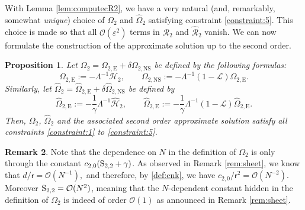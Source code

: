 \documentclass[11pt,reqno,a4paper]{amsart}
\def\eps{\varepsilon}
\newcommand{\cH}{\mathcal{H}}
\newcommand{\cL}{\mathcal{L}}
\newcommand{\cO}{\mathcal{O}}
\newcommand{\cR}{\mathcal{R}}
\newcommand{\1}{\mathbbm{1}}
\newtheorem{proposition}{Proposition}[section]
\theoremstyle{definition}
\newtheorem{remark}[proposition]{Remark}
\theoremstyle{definition}
\numberwithin{equation}{section}
\begin{document}
With Lemma \ref{lem:computecR2}, we have a very natural (and, remarkably, somewhat \emph{unique}) choice of $\Omega_2$ and $\widehat{\Omega}_2$ satisfying constraint \ref{constraint:5}. This choice is made so that all $\cO(\eps^2)$ terms in $\cR_2$ and $\widehat{\cR}_2$ vanish. We can now formulate the construction of the approximate solution up to the second order.
\begin{proposition}
\label{prop:Om2}
Let $\Omega_2 =  \Omega_{2,\mathrm{E}} + \delta\Omega_{2,\mathrm{NS}}$ be defined by the following formulas:
    \begin{equation}
        \Omega_{2,\mathrm{E}} := -\Lambda^{-1} \cH_2, \qquad \Omega_{2,\mathrm{NS}} := -\Lambda^{-1} (1-\cL)\Omega_{2,\mathrm{E}}.
    \end{equation}
     Similarly, let $\widehat{\Omega}_2 =  \widehat{\Omega}_{2,\mathrm{E}} + \delta\widehat{\Omega}_{2,\mathrm{NS}}$ be defined by
    \begin{equation}
        \widehat{\Omega}_{2,\mathrm{E}} := -\frac{1}{\gamma}\Lambda^{-1} \widehat{\cH}_2, \qquad \widehat{\Omega}_{2,\mathrm{E}} :=  -\frac{1}{\gamma}\Lambda^{-1} (1-\cL)\widehat{\Omega}_{2,\mathrm{E}}.
    \end{equation}
Then, $\Omega_2$, $\widehat{\Omega}_2$ and the associated second order approximate solution satisfy all constraints \ref{constraint:1} to \ref{constraint:5}.
\end{proposition}
\begin{remark}
\label{rem:Om2Ninfinity} Note that the dependence on $N$ in the definition of $\Omega_2$ is only through the constant $c_{2,0}({\rm S}_{2,2}+\gamma)$. As observed in Remark \ref{rem:sheet}, we know that $d/\mathsf{r}=\cO(N^{-1}),$ and therefore, by \cref{def:cnk}, we have $c_{2,0}/\mathsf{r}^2=\cO(N^{-2})$. Moreover ${\rm S}_{2,2}=\cO(N^2)$, meaning that  the $N$-dependent constant hidden in the definition of $\Omega_2$ is indeed of order $\cO(1)$ as announced in Remark \ref{rem:sheet}. 
\end{remark}
\end{document}
